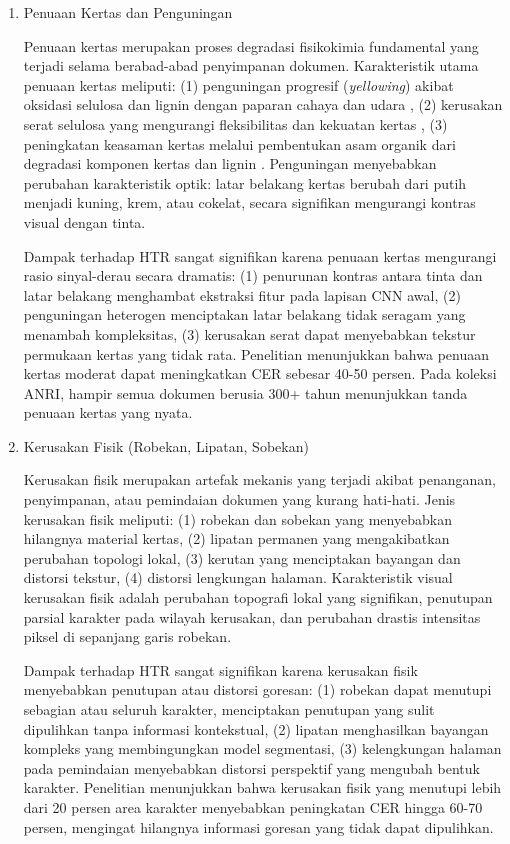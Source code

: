 \begin{enumerate}[leftmargin=*, labelindent=0pt, itemsep=1ex, topsep=0pt]
\item Penuaan Kertas dan Penguningan
\label{para:penuaan-kertas}

Penuaan kertas merupakan proses degradasi fisikokimia fundamental yang terjadi selama berabad-abad penyimpanan dokumen. Karakteristik utama penuaan kertas meliputi: (1) penguningan progresif (\textit{yellowing}) akibat oksidasi selulosa dan lignin dengan paparan cahaya dan udara \parencite{reilly1993}, (2) kerusakan serat selulosa yang mengurangi fleksibilitas dan kekuatan kertas \parencite{porck2000}, (3) peningkatan keasaman kertas melalui pembentukan asam organik dari degradasi komponen kertas dan lignin \parencite{neevel1995}. Penguningan menyebabkan perubahan karakteristik optik: latar belakang kertas berubah dari putih menjadi kuning, krem, atau cokelat, secara signifikan mengurangi kontras visual dengan tinta.

Dampak terhadap HTR sangat signifikan karena penuaan kertas mengurangi rasio sinyal-derau secara dramatis: (1) penurunan kontras antara tinta dan latar belakang menghambat ekstraksi fitur pada lapisan CNN awal, (2) penguningan heterogen menciptakan latar belakang tidak seragam yang menambah kompleksitas, (3) kerusakan serat dapat menyebabkan tekstur permukaan kertas yang tidak rata. Penelitian \parencite{gatos2006} menunjukkan bahwa penuaan kertas moderat dapat meningkatkan CER sebesar 40-50 persen. Pada koleksi ANRI, hampir semua dokumen berusia 300+ tahun menunjukkan tanda penuaan kertas yang nyata.

\item Kerusakan Fisik (Robekan, Lipatan, Sobekan)
\label{para:kerusakan-fisik}

Kerusakan fisik merupakan artefak mekanis yang terjadi akibat penanganan, penyimpanan, atau pemindaian dokumen yang kurang hati-hati. Jenis kerusakan fisik meliputi: (1) robekan dan sobekan yang menyebabkan hilangnya material kertas, (2) lipatan permanen yang mengakibatkan perubahan topologi lokal, (3) kerutan yang menciptakan bayangan dan distorsi tekstur, (4) distorsi lengkungan halaman. Karakteristik visual kerusakan fisik adalah perubahan topografi lokal yang signifikan, penutupan parsial karakter pada wilayah kerusakan, dan perubahan drastis intensitas piksel di sepanjang garis robekan.

Dampak terhadap HTR sangat signifikan karena kerusakan fisik menyebabkan penutupan atau distorsi goresan: (1) robekan dapat menutupi sebagian atau seluruh karakter, menciptakan penutupan yang sulit dipulihkan tanpa informasi kontekstual, (2) lipatan menghasilkan bayangan kompleks yang membingungkan model segmentasi, (3) kelengkungan halaman pada pemindaian menyebabkan distorsi perspektif yang mengubah bentuk karakter. Penelitian menunjukkan bahwa kerusakan fisik yang menutupi lebih dari 20 persen area karakter menyebabkan peningkatan CER hingga 60-70 persen, mengingat hilangnya informasi goresan yang tidak dapat dipulihkan.


\end{enumerate}

